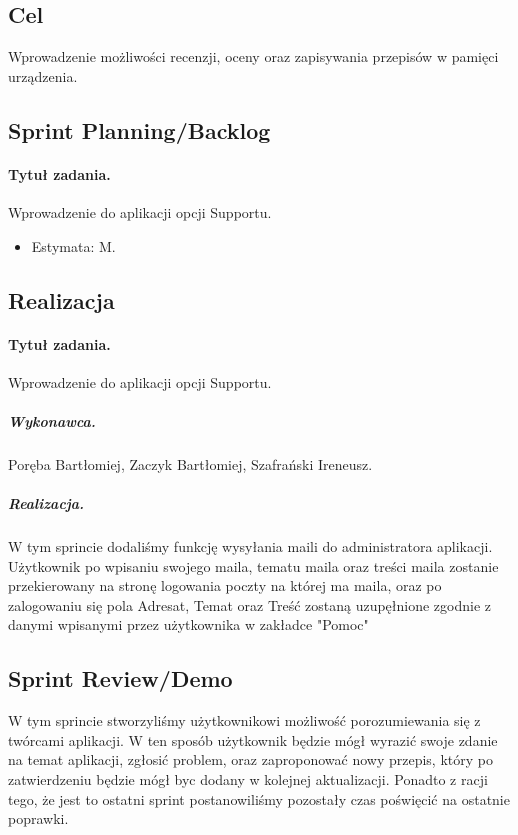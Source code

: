 \documentclass[a4paper]{article}
\begin{document}
	\subsection{Cel} Wprowadzenie możliwości recenzji, oceny oraz zapisywania przepisów w pamięci urządzenia.
	
	\subsection{Sprint Planning/Backlog}
	
	\paragraph{Tytuł zadania.} Wprowadzenie do aplikacji opcji Supportu.
	\begin{itemize}
		\item Estymata: M.
	\end{itemize}
	
	
	\subsection{Realizacja}
	
	\paragraph{Tytuł zadania.} Wprowadzenie do aplikacji opcji Supportu.
	\subparagraph{Wykonawca.} Poręba Bartłomiej, Zaczyk Bartłomiej, Szafrański Ireneusz.
	\subparagraph{Realizacja.} 
	W tym sprincie dodaliśmy funkcję wysyłania maili do administratora aplikacji. Użytkownik po wpisaniu swojego maila, tematu maila oraz treści maila zostanie przekierowany na stronę logowania poczty na której ma maila, oraz po zalogowaniu się pola Adresat, Temat oraz Treść zostaną uzupęłnione zgodnie z danymi wpisanymi przez użytkownika w zakładce "Pomoc"
	
	
	
	\subsection{Sprint Review/Demo}
	W tym sprincie stworzyliśmy użytkownikowi możliwość porozumiewania się z twórcami aplikacji. W ten sposób użytkownik będzie mógł wyrazić swoje zdanie na temat aplikacji, zgłosić problem, oraz zaproponować nowy przepis, który po zatwierdzeniu będzie mógł byc dodany w kolejnej aktualizacji. Ponadto z racji tego, że jest to ostatni sprint postanowiliśmy pozostały czas poświęcić na ostatnie poprawki.
	
\end{document}

